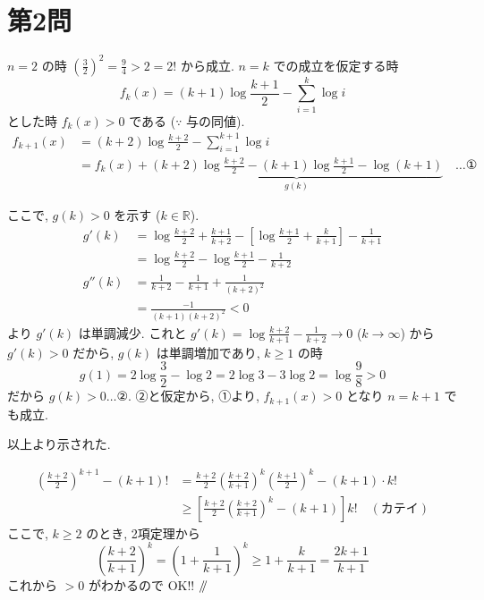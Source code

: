 \documentclass[../main.tex]{subfiles}
\begin{document}
\newpage

\section*{第2問}

\noindent
[\textbf{解}] $n=2$ の時 $\left(\frac{3}{2}\right)^2 = \frac{9}{4} > 2 = 2!$ から成立. $n=k$ での成立を仮定する時
\[
  f_k(x) = (k+1)\log \frac{k+1}{2} - \sum_{i=1}^k \log i
\]
とした時 $f_k(x) > 0$ である ($\because$ 与の同値).
\begin{align*}
  f_{k+1}(x) &= (k+2)\log \frac{k+2}{2} - \sum_{i=1}^{k+1} \log i \\
  &= f_k(x) + \underbrace{(k+2)\log\frac{k+2}{2} - (k+1)\log\frac{k+1}{2} - \log(k+1)}_{g(k)} \quad \dots \text{①}
\end{align*}

\noindent
ここで, $g(k) > 0$ を示す ($k \in \mathbb{R}$).
\begin{align*}
  g'(k) &= \log\frac{k+2}{2} + \frac{k+1}{k+2} - \left[ \log\frac{k+1}{2} + \frac{k}{k+1} \right] - \frac{1}{k+1} \\
  &= \log\frac{k+2}{2} - \log\frac{k+1}{2} - \frac{1}{k+2} \\
  g''(k) &= \frac{1}{k+2} - \frac{1}{k+1} + \frac{1}{(k+2)^2} \\
  &= \frac{-1}{(k+1)(k+2)^2} < 0
\end{align*}
より $g'(k)$ は単調減少. これと $g'(k) = \log\frac{k+2}{k+1} - \frac{1}{k+2} \to 0$ ($k \to \infty$) から $g'(k) > 0$ だから, $g(k)$ は単調増加であり, $k \ge 1$ の時
\[
  g(1) = 2\log\frac{3}{2} - \log 2 = 2\log 3 - 3\log 2 = \log\frac{9}{8} > 0
\]
だから $g(k) > 0 \dots \text{②}$.
②と仮定から, ①より, $f_{k+1}(x) > 0$ となり $n=k+1$ でも成立.

\noindent
以上より示された.

\bigskip

\begin{align*}
  \left(\frac{k+2}{2}\right)^{k+1} - (k+1)! &= \frac{k+2}{2} \left(\frac{k+2}{k+1}\right)^k \left(\frac{k+1}{2}\right)^k - (k+1) \cdot k! \\
  &\ge \left[ \frac{k+2}{2} \left(\frac{k+2}{k+1}\right)^k - (k+1) \right] k! \quad (\text{カテイ})
\end{align*}
ここで, $k \ge 2$ のとき, 2項定理から
\[
  \left(\frac{k+2}{k+1}\right)^k = \left(1 + \frac{1}{k+1}\right)^k \ge 1 + \frac{k}{k+1} = \frac{2k+1}{k+1}
\]
これから $> 0$ がわかるので OK!! \hfill $\mathbin{/\mkern-5mu/}$
\end{document}
